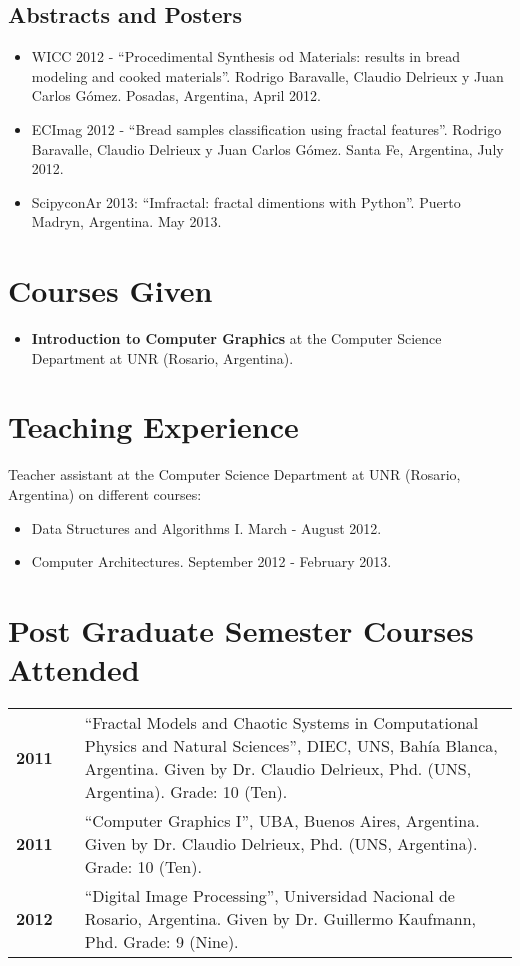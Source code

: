 \documentclass[a4paper,12pt]{article}
\begin{document}
\subsection*{Abstracts and Posters}
\begin{itemize}
\item WICC 2012 - \textquotedblleft Procedimental Synthesis od Materials: results in bread modeling and cooked materials\textquotedblright. Rodrigo Baravalle, Claudio Delrieux y Juan Carlos G\'omez. Posadas, Argentina, April 2012.
\item ECImag 2012 - \textquotedblleft Bread samples classification using fractal features\textquotedblright. Rodrigo Baravalle, Claudio Delrieux y Juan Carlos G\'omez. Santa Fe, Argentina, July 2012.
\item ScipyconAr 2013: \textquotedblleft Imfractal: fractal dimentions with Python\textquotedblright. Puerto Madryn, Argentina. May 2013.
\end{itemize}


\section*{Courses Given}
\begin{itemize}
\item {\bf Introduction to Computer Graphics} at the Computer Science Department at UNR (Rosario, Argentina).
\end{itemize}

\section*{Teaching Experience}

Teacher assistant at the Computer Science Department at UNR (Rosario, Argentina) on different courses:
\begin{itemize}
\item Data Structures and Algorithms I. March - August 2012.
\item Computer Architectures. September 2012 - February 2013.
\end{itemize}


\section*{Post Graduate Semester Courses Attended}

\begin{tabular}{lcp{12 cm}}
\bf{2011}& & \textquotedblleft Fractal Models and Chaotic Systems in Computational Physics and Natural Sciences\textquotedblright, DIEC, UNS, Bah\'ia Blanca, Argentina. Given by Dr. Claudio Delrieux, Phd. (UNS, Argentina). Grade: 10 (Ten).\\
\bf{2011}& & \textquotedblleft Computer Graphics I\textquotedblright, UBA, Buenos Aires, Argentina. Given by Dr. Claudio Delrieux, Phd. (UNS, Argentina). Grade: 10 (Ten).\\
\bf{2012}& & \textquotedblleft Digital Image Processing\textquotedblright, Universidad Nacional de Rosario, Argentina. Given by Dr. Guillermo Kaufmann, Phd. Grade: 9 (Nine).\\
\end{tabular}
\end{document}
